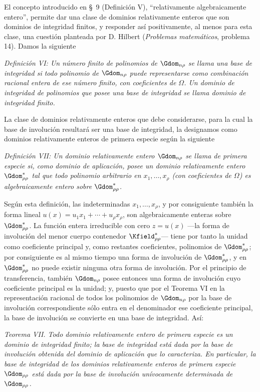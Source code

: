 \documentclass[11pt]{article}
\begin{document}
El concepto introducido en \S\ 9 (Definición V), ``relativamente algebraicamente entero'', permite dar una clase de dominios relativamente enteros que son dominios de integridad finitos, y responder así positivamente, al menos para esta clase, una cuestión planteada por D. Hilbert (\emph{Problemas matemáticos}, problema 14). Damos la siguiente

\emph{Definición VI: Un número finito de polinomios de $\Gdom_{n\rho}$ se llama una base de integridad si todo polinomio de $\Gdom_{n\rho}$ puede representarse como combinación racional entera de ese número finito, con coeficientes de $\Omega$. Un dominio de integridad de polinomios que posee una base de integridad se llama dominio de integridad finito.}

La clase de dominios relativamente enteros que debe considerarse, para la cual la base de involución resultará ser una base de integridad, la designamos como dominios relativamente enteros de primera especie según la siguiente

\emph{Definición VII: Un dominio relativamente entero $\Gdom_{n\rho}$ se llama de primera especie si, como dominio de aplicación, posee un dominio relativamente entero $\Gdom^*_{\rho\rho}$ tal que todo polinomio arbitrario en $x_1,\ldots,x_\rho$ (con coeficientes de $\Omega$) es algebraicamente entero sobre $\Gdom^*_{\rho\rho}$.}

Según esta definición, las indeterminadas $x_1,\ldots,x_\rho$, y por consiguiente también la forma lineal $u(x)=u_1x_1+\cdots+u_\rho x_\rho$, son algebraicamente enteras sobre $\Gdom^*_{\rho\rho}$. La función entera irreducible con cero $z=u(x)$ ---la forma de involución del menor cuerpo contenedor $\Kfield^*_{\rho\rho}$--- tiene por tanto la unidad como coeficiente principal y, como restantes coeficientes, polinomios de $\Gdom^*_{\rho\rho}$; por consiguiente es al mismo tiempo una forma de involución de $\Gdom^*_{\rho\rho}$, y en $\Gdom^*_{\rho\rho}$ no puede existir ninguna otra forma de involución. Por el principio de transferencia, también $\Gdom_{n\rho}$ posee entonces una forma de involución cuyo coeficiente principal es la unidad; y, puesto que por el Teorema VI en la representación racional de todos los polinomios de $\Gdom_{n\rho}$ por la base de involución correspondiente sólo entra en el denominador ese coeficiente principal, la base de involución se convierte en una base de integridad. Así:

\emph{Teorema VII. Todo dominio relativamente entero de primera especie es un dominio de integridad finito; la base de integridad está dada por la base de involución obtenida del dominio de aplicación que lo caracteriza. En particular, la base de integridad de los dominios relativamente enteros de primera especie $\Gdom_{\rho\rho}$ está dada por la base de involución unívocamente determinada de $\Gdom_{\rho\rho}$.}
\end{document}
